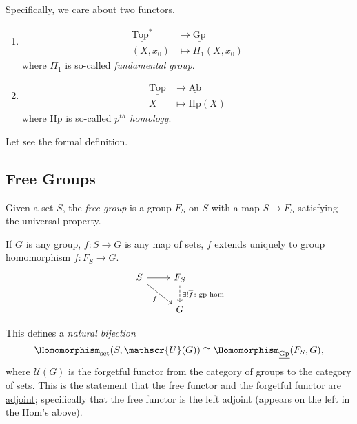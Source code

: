 \hr

Specifically, we care about two functors.
\begin{enumerate}
	\item
	      \[
		      \begin{split}
			      \underline{\mathrm{Top}^*} &\to \underline{\mathrm{Gp}} \\
			      (X, x_0)&\mapsto \Pi_1(X, x_0)
		      \end{split}
	      \]
	      where \(\Pi _1\) is so-called \emph{fundamental group}.
	\item
	      \[
		      \begin{split}
			      \underline{\mathrm{Top}} &\to \underline{\mathrm{Ab}} \\
			      X&\mapsto \mathrm{Hp}(X)
		      \end{split}
	      \]
	      where \(\mathrm{Hp} \) is so-called \emph{\(p^{th}\) homology}.
\end{enumerate}

Let see the formal definition.

\subsection{Free Groups}
\begin{definition}
	Given a set \(S\), the \emph{free group} is a group \(F_S\) on \(S\) with a map \(S\to F_S\) satisfying the
	universal property.

	If \(G\) is any group, \(f\colon S\to G\) is any map of sets, \(f\) extends uniquely to group homomorphism \(\overline{f} \colon F_S \to G\).
	\[
		\begin{tikzcd}
			S \ar[rd, "f"']\ar[r, ] & F_S\ar[d, dashed, "\exists ! \overline{f} \colon \text{gp hom} "]\\
			& G
		\end{tikzcd}
	\]
\end{definition}
\begin{note}
	This defines a \emph{natural bijection}
	\[
		\Homomorphism_{\underline{\mathrm{set}}}(S, \mathscr{U}(G))\cong \Homomorphism_{\underline{\mathrm{Gp}}}(F_S, G),
	\]
	where \(\mathscr{U} (G)\) is the forgetful functor from the category of groups to the category of sets. This is the
	statement that the free functor and the forgetful functor are \hyperref[def:adjoint-functor]{adjoint};
	specifically that the free functor is the left adjoint (appears on the left in the Hom's above).
\end{note}

